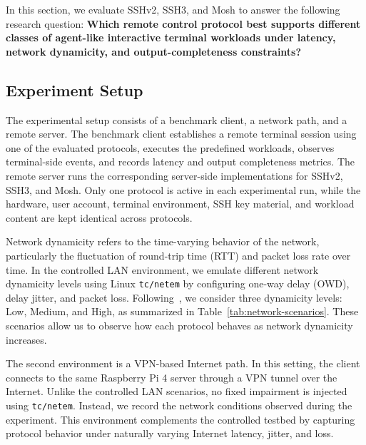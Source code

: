 In this section, we evaluate SSHv2, SSH3, and Mosh to answer the
following research question: \textbf{Which remote control protocol best supports different classes of agent-like interactive terminal workloads under latency, network dynamicity, and output-completeness constraints?}

\subsection{Experiment Setup}
\label{subsec:experiment-setup}

The experimental setup consists of a benchmark client, a network path,
and a remote server. The benchmark client establishes a remote terminal session using one of the evaluated protocols, executes the predefined workloads, observes terminal-side events, and records latency and output completeness metrics. The remote server runs the corresponding server-side implementations for SSHv2, SSH3, and Mosh. Only one protocol is active in each experimental run, while the hardware, user account, terminal environment, SSH key material, and workload content are kept identical across protocols.

Network dynamicity refers to the time-varying behavior of the network,
particularly the fluctuation of round-trip time (RTT) and packet loss rate over time. In the controlled LAN environment, we emulate different network dynamicity levels using Linux \texttt{tc/netem} by configuring one-way delay (OWD), delay jitter, and packet loss. Following~\cite{NGUYEN2024107924}, we consider three dynamicity levels: Low, Medium, and High, as summarized in Table~\ref{tab:network-scenarios}. These scenarios allow us to observe how each protocol behaves as network dynamicity increases.


The second environment is a VPN-based Internet path. In this setting, the client connects to the same Raspberry Pi 4 server through a VPN tunnel over the Internet. Unlike the controlled LAN scenarios, no fixed impairment is injected using \texttt{tc/netem}. Instead, we record the network conditions observed during the experiment. This environment complements the controlled testbed by capturing protocol behavior under naturally varying Internet latency, jitter, and loss.

